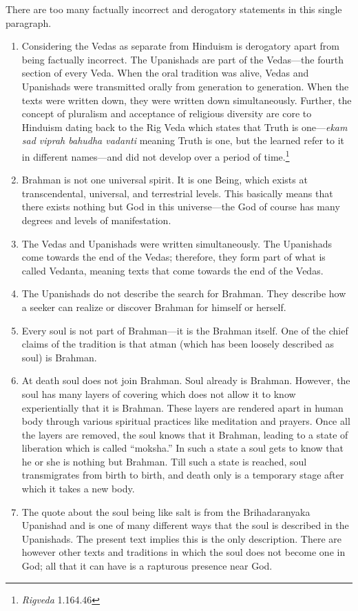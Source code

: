 There are too many factually incorrect and derogatory statements in this single paragraph.
\begin{enumerate}
\itemsep=1pt
\item 
Considering the Vedas as separate from Hinduism is derogatory apart from being factually incorrect. The Upanishads are part of the Vedas—the fourth section of every Veda. When the oral tradition was alive, Vedas and Upanishads were transmitted orally from generation to generation. When the texts were written down, they were written down simultaneously. Further, the concept of pluralism and acceptance of religious diversity are core to Hinduism dating back to the Rig Veda which states that Truth is one—\textit{ekam sad viprah bahudha vadanti} meaning Truth is one, but the learned refer to it in different names—and did not develop over a period of time.\footnote{\textit{Rigveda} 1.164.46}
\item 
Brahman is not one universal spirit. It is one Being, which exists at transcendental, universal, and terrestrial levels. This basically means that there exists nothing but God in this universe—the God of course has many degrees and levels of manifestation. 
\item 
The Vedas and Upanishads were written simultaneously. The Upanishads come towards the end of the Vedas; therefore, they form part of what is called Vedanta, meaning texts that come towards the end of the Vedas. 
\item 
The Upanishads do not describe the search for Brahman. They describe how a seeker can realize or discover Brahman for himself or herself. 
\item 
Every soul is not part of Brahman—it is the Brahman itself. One of the chief claims of the tradition is that atman (which has been loosely described as soul) is Brahman. 
\item 
At death soul does not join Brahman. Soul already is Brahman. However, the soul has many layers of covering which does not allow it to know experientially that it is Brahman. These layers are rendered apart in human body through various spiritual practices like meditation and prayers. Once all the layers are removed, the soul knows that it Brahman, leading to a state of liberation which is called “moksha.” In such a state a soul gets to know that he or she is nothing but Brahman. Till such a state is reached, soul transmigrates from birth to birth, and death only is a temporary stage after which it takes a new body.
\item 
The quote about the soul being like salt is from the Brihadaranyaka Upanishad and is one of many different ways that the soul is described in the Upanishads. The present text implies this is the only description. There are however other texts and traditions in which the soul does not become one in God; all that it can have is a rapturous presence near God.

\end{enumerate}
